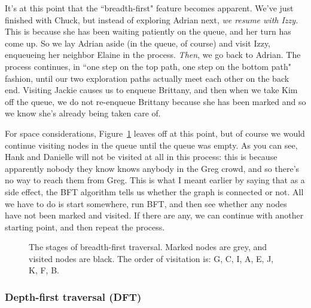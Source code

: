 It's at this point that the ``breadth-first" feature becomes apparent.
We've just finished with Chuck, but instead of exploring Adrian next,
\textit{we resume with Izzy.} This is because she has been waiting
patiently on the queue, and her turn has come up. So we lay Adrian aside
(in the queue, of course) and visit Izzy, enqueueing her neighbor Elaine in
the process. \textit{Then}, we go back to Adrian. The process continues, in
``one step on the top path, one step on the bottom path" fashion, until our
two exploration paths actually meet each other on the back end. Visiting
Jackie causes us to enqueue Brittany, and then when we take Kim off the
queue, we do not re-enqueue Brittany because she has been marked and so we
know she's already being taken care of. 

For space considerations, Figure~\ref{BFT} leaves off at this point, but of
course we would continue visiting nodes in the queue until the queue was
empty. As you can see, Hank and Danielle will not be visited at all in this
process: this is because apparently nobody they know knows anybody in the
Greg crowd, and so there's no way to reach them from Greg. This is what I
meant earlier by saying that as a side effect, the BFT algorithm tells us
whether the graph is connected or not. All we have to do is start
somewhere, run BFT, and then see whether any nodes have not been marked and
visited. If there are any, we can continue with another starting point, and
then repeat the process.


\begin{figure}[ht]
\centering
\begin{custommargins}{-1.4cm}{-1.8cm}
\caption{The stages of breadth-first traversal. Marked nodes are grey, and
visited nodes are black. The order of visitation is: G, C, I, A, E, J, K,
F, B.}
\label{BFT}
\end{custommargins}
\end{figure}

\afterpage{\clearpage}

\subsubsection{Depth-first traversal (DFT)}

